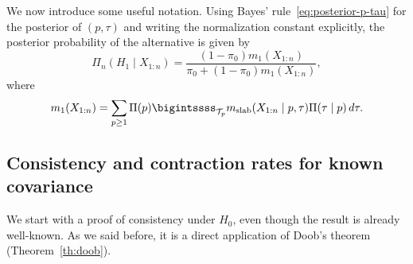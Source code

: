 We now introduce some useful notation. Using Bayes' rule~\eqref{eq:posterior-p-tau} for the posterior of \((p,\tau)\) and writing the normalization constant explicitly, the posterior probability of the alternative is given by
\begin{equation}\label{eq:posterior-slab}
\Pi_n(H_1\mid X_{1:n})= \frac{(1-\pi_0)m_1(X_{1:n})}{\pi_0 + (1-\pi_0)m_1(X_{1:n})},
\end{equation}
where
\begin{equation}\label{eq:posterior-slab-m1}
m_1(X_{1:n}) = \sum_{p\geq 1} \Pi(p)\bigintssss_{\mathcal T_p} \mslab(X_{1:n}\mid p,\tau)\Pi(\tau\mid p) \, d\tau.
\end{equation}

\subsection{Consistency and contraction rates for known covariance}

We start with a proof of consistency under \(H_0\), even though the result is already well-known. As we said before, it is a direct application of Doob's theorem (Theorem~\ref{th:doob}).

